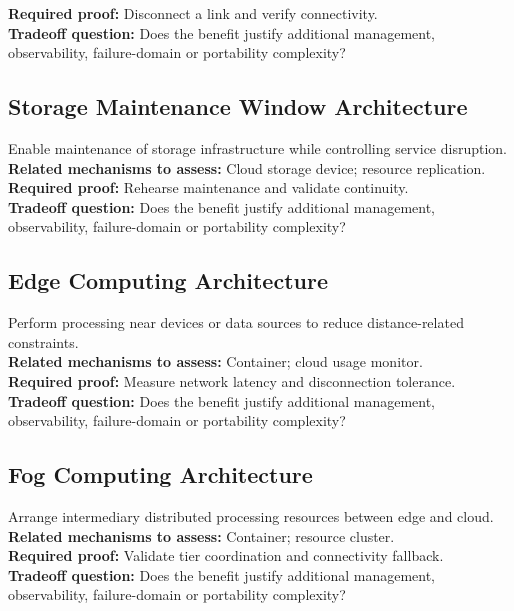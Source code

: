 \documentclass[10pt,letterpaper]{article}
\begin{document}
\textbf{Required proof:} Disconnect a link and verify connectivity.\\[3pt]
\textbf{Tradeoff question:} Does the benefit justify additional management, observability, failure-domain or portability complexity?\\[3pt]
\subsection{Storage Maintenance Window Architecture}
Enable maintenance of storage infrastructure while controlling service disruption.\\[3pt]
\textbf{Related mechanisms to assess:} Cloud storage device; resource replication.\\[3pt]
\textbf{Required proof:} Rehearse maintenance and validate continuity.\\[3pt]
\textbf{Tradeoff question:} Does the benefit justify additional management, observability, failure-domain or portability complexity?\\[3pt]
\subsection{Edge Computing Architecture}
Perform processing near devices or data sources to reduce distance-related constraints.\\[3pt]
\textbf{Related mechanisms to assess:} Container; cloud usage monitor.\\[3pt]
\textbf{Required proof:} Measure network latency and disconnection tolerance.\\[3pt]
\textbf{Tradeoff question:} Does the benefit justify additional management, observability, failure-domain or portability complexity?\\[3pt]
\subsection{Fog Computing Architecture}
Arrange intermediary distributed processing resources between edge and cloud.\\[3pt]
\textbf{Related mechanisms to assess:} Container; resource cluster.\\[3pt]
\textbf{Required proof:} Validate tier coordination and connectivity fallback.\\[3pt]
\textbf{Tradeoff question:} Does the benefit justify additional management, observability, failure-domain or portability complexity?\\[3pt]
\end{document}
